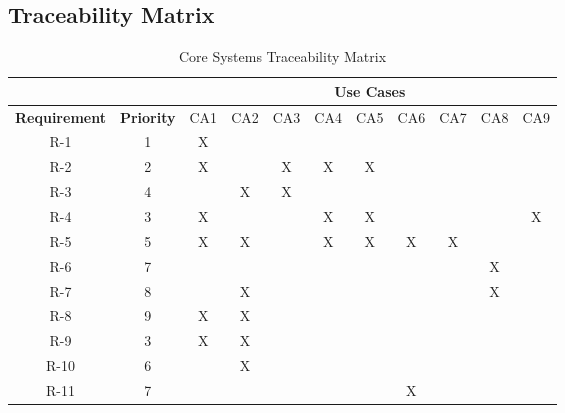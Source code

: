 \documentclass[12pt,a4paper]{article}
\begin{document}
	\subsection{Traceability Matrix}
			\begin{table}[h!]
				\centering
				\caption{Core Systems Traceability Matrix}
				\label{my-label}
				\begin{tabular}{cc|c|c|c|c|c|c|c|c|c|}
					\cline{3-11}
					                                           &                   & \multicolumn{9}{c|}{\textbf{Use Cases}} 				     \\ \hline
					\multicolumn{1}{|c|}{\textbf{Requirement}} & \textbf{Priority} & CA1 & CA2  & CA3  & CA4  & CA5  & CA6 & CA7 & CA8 & CA9      \\ \hline
					\multicolumn{1}{|c|}{R-1}                 & 1                 & X    &      &      &      &     &   &  &   &   				  \\ \hline
					\multicolumn{1}{|c|}{R-2}                 & 2                 & X    &      & X    & X    & X   &   &  &   &   				   \\ \hline
					\multicolumn{1}{|c|}{R-3}                 & 4                 &      & X    & X    &      &     &   &  &   &     				\\ \hline
					\multicolumn{1}{|c|}{R-4}                 & 3                 & X    &      &      & X    & X   &   &  &   & X     				\\ \hline
					\multicolumn{1}{|c|}{R-5}                 & 5                 & X    & X    &      & X    & X   & X & X&   &    				\\ \hline
					\multicolumn{1}{|c|}{R-6}                 & 7                 &      &      &      &      &     &   &  & X &    				\\ \hline
					\multicolumn{1}{|c|}{R-7}                 & 8                 &      & X    &      &      &     &   &  & X &     				\\ \hline
					\multicolumn{1}{|c|}{R-8}                 & 9                 & X    & X    &      &      &     &   &  &   &     				\\ \hline
					\multicolumn{1}{|c|}{R-9}                 & 3                 & X    & X    &      &      &     &   &  &   &     				\\ \hline
					\multicolumn{1}{|c|}{R-10}                 & 6                 &     & X    &      &      &     &   &  &   &    				\\ \hline
					\multicolumn{1}{|c|}{R-11}                 & 7                 &     &      &      &      &     & X &  &   &     				\\ \hline

\end{tabular}
\end{table}
\end{document}
